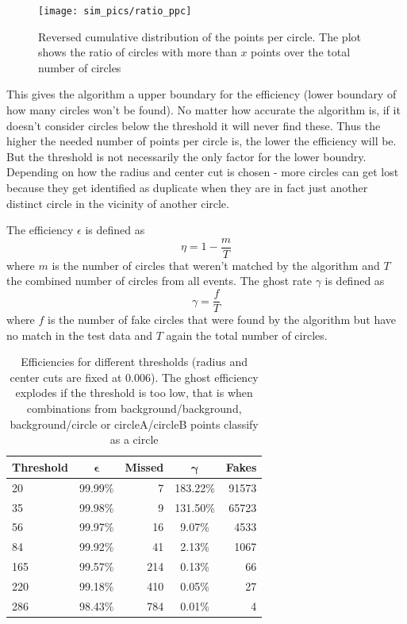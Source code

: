 \documentclass[11pt,twoside]{scrreprt}
\begin{document}
\begin{figure}[tb]
  \centering
  \texttt{[image: sim\_pics/ratio\_ppc]}
  \caption{Reversed cumulative distribution of the points per circle. The plot shows the ratio of circles with more than $x$ points over the
  total number of circles}
  \label{fig:ratio_ppc}
\end{figure}

This gives the algorithm a upper boundary for the efficiency (lower boundary of how many circles won't be found). No matter 
how accurate the algorithm is, if it doesn't consider circles below the threshold it will never find these. Thus the higher 
the needed number of points per circle is, the lower the efficiency will be. But the threshold is not necessarily the only
factor for the lower boundry. Depending on how the radius and center cut is chosen - more circles can get lost because
they get identified as duplicate when they are in fact just another distinct circle in the vicinity of another circle.

The efficiency $\epsilon$ is defined as 
\begin{equation}
\eta = 1 - \frac{m}{T}    
\end{equation}
where $m$ is the number of circles that weren't matched by the algorithm and $T$ the combined number of circles from
all events. The ghost rate $\gamma$ is defined as 
\begin{equation}
  \gamma = \frac{f}{T} 
\end{equation}
where $f$ is the number of fake circles that were found by the algorithm but have no match in the test data and $T$ again the
total number of circles.

\begin{table}[tb]
  \caption[Efficiencies for different thresholds]{Efficiencies for different thresholds (radius and center cuts are fixed at $0.006$). The ghost efficiency explodes if the threshold is too low, that is when combinations
  from background/background, background/circle or circleA/circleB points classify as a circle}
  \label{tab:threshold_cuts}
  \centering

  \begin{tabular}{lcrcr}
  \toprule
  \textbf{Threshold} & $\boldsymbol{\epsilon}$ & \textbf{Missed} & $\boldsymbol{\gamma}$ & \textbf{Fakes} \\
  \midrule
  20  & 99.99\% & 7 & 183.22\% & 91573 \\
  35  & 99.98\% & 9 & 131.50\% & 65723 \\
  56  & 99.97\% & 16 & 9.07\% & 4533 \\
  84  & 99.92\% & 41 & 2.13\% & 1067 \\
  165 & 99.57\% & 214 & 0.13\% & 66 \\
  220 & 99.18\% & 410 & 0.05\% & 27 \\
  286 & 98.43\% & 784 & 0.01\% & 4 \\
  \bottomrule
  \end{tabular}
\end{table}
\end{document}

